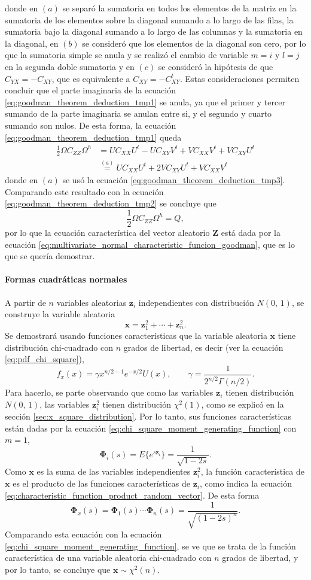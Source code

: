 \documentclass[a4paper]{report}
\newcommand{\Z}{\mathbf{Z}}
\newcommand{\x}{\mathbf{x}}
\newcommand{\z}{\mathbf{z}}
\newcommand{\Phibf}{\mathbf{\Phi}}
\begin{document}
donde en \((a)\) se separó la sumatoria en todos los elementos de la matriz en la sumatoria de los elementos sobre la diagonal sumando a lo largo de las filas, la sumatoria bajo la diagonal sumando a lo largo de las columnas y la sumatoria en la diagonal, en \((b)\) se consideró que los elementos de la diagonal son cero, por lo que la sumatoria simple se anula y se realizó el cambio de variable \(m=i\) y \(l=j\) en la segunda doble sumatoria y en \((c)\) se consideró la hipótesis de que \(C_{YX}=-C_{XY}\), que es equivalente a \(C_{XY}=-C_{XY}^t\). Estas consideraciones permiten concluir que el parte imaginaria de la ecuación \ref{eq:goodman_theorem_deduction_tmp1} se anula, ya que el primer y tercer sumando de la parte imaginaria se anulan entre si, y el segundo y cuarto sumando son nulos. De esta forma, la ecuación \ref{eq:goodman_theorem_deduction_tmp1} queda
\begin{align*}
 \frac{1}{2}\Omega C_{ZZ}\Omega^h&=UC_{XX}U^t-UC_{XY}V^t+VC_{XX}V^t+VC_{XY}U^t\\
   &\overset{(a)}{=}UC_{XX}U^t+2VC_{XY}U^t+VC_{XX}V^t
\end{align*}
donde en \((a)\) se usó la ecuación \ref{eq:goodman_theorem_deduction_tmp3}. Comparando este resultado con la ecuación \ref{eq:goodman_theorem_deduction_tmp2} se concluye que
\[
 \frac{1}{2}\Omega C_{ZZ}\Omega^h = Q,
\]
por lo que la ecuación característica del vector aleatorio \(\Z\) está dada por la ecuación \ref{eq:multivariate_normal_characteristic_funcion_goodman}, que es lo que se quería demostrar.

\paragraph{Formas cuadráticas normales} A partir de \(n\) variables aleatorias \(\z_i\)  independientes con distribución \(N(0,\,1)\), se construye la variable aleatoria
\[
 \x=\z_1^2+\cdots+\z_n^2.
\]
Se demostrará usando funciones características que la variable aleatoria \(\x\) tiene distribución chi-cuadrado con \(n\) grados de libertad, es decir (ver la ecuación \ref{eq:pdf_chi_square}), 
\[
 f_x(x)=\gamma x^{n/2-1}e^{-x/2}U(x),\qquad \gamma=\frac{1}{2^{n/2}\Gamma(n/2)}.
\]
Para hacerlo, se parte observando que como las variables \(\z_i\) tienen distribución \(N(0,\,1)\), las variables \(\z_i^2\) tienen distribución \(\chi^2(1)\), como se explicó en la sección \ref{sec:x_square_distribution}. Por lo tanto, sus funciones características están dadas por la ecuación \ref{eq:chi_square_moment_generating_function} con \(m=1\),
\[
 \Phibf_i(s)=E\{e^{s\z_i}\}=\frac{1}{\sqrt{1-2s}}.
\]
Como \(\x\) es la suma de las variables independientes \(\z_i^2\), la función característica de \(\x\) es el producto de las funciones características de \(\z_i\), como indica la ecuación \ref{eq:characteristic_function_product_random_vector}. De esta forma
\[
 \Phibf_x(s)=\Phibf_1(s)\cdots\Phibf_n(s)=\frac{1}{\sqrt{(1-2s)^n}}.
\]
Comparando esta ecuación con la ecuación \ref{eq:chi_square_moment_generating_function}, se ve que se trata de la función característica de una variable aleatoria chi-cuadrado con \(n\) grados de libertad, y por lo tanto, se concluye que \(\x\sim\chi^2(n)\).
\end{document}
